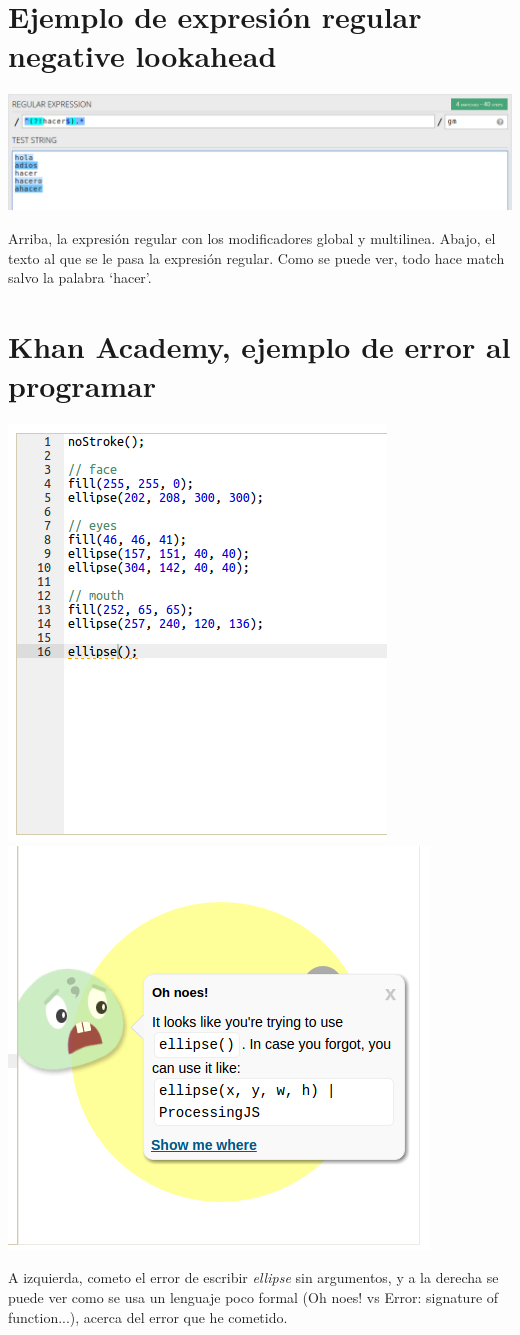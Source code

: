 \documentclass{report}
\begin{document}
	\chapter{Ejemplo de expresión regular negative lookahead} \label{app:c}
	
	\begin{center}
		\includegraphics[width=1\linewidth]{negativelookahead}
		
		Arriba, la expresión regular con los modificadores global y multilinea.
		Abajo, el texto al que se le pasa la expresión regular. Como se puede ver, todo hace match salvo la palabra `hacer'.
	\end{center}
	
	\chapter{Khan Academy, ejemplo de error al programar} \label{app:d}
	
	\begin{center}
		\includegraphics[width=0.45\linewidth]{khanerror}
		\includegraphics[width=0.45\linewidth]{khanerror2}
		
		A izquierda, cometo el error de escribir \textit{ellipse} sin argumentos, y a la derecha se puede ver como se usa un lenguaje poco formal (Oh noes! vs Error: signature of function...), acerca del error que he cometido.
	\end{center}
	
\end{document}
